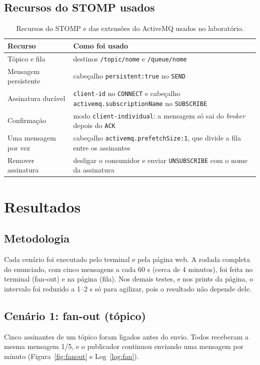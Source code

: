 \documentclass[11pt,a4paper]{article}
\begin{document}
\subsection{Recursos do STOMP usados}
\begin{table}[H]
\centering
\small
\begin{tabular}{@{}>{\raggedright\arraybackslash}p{5cm}>{\raggedright\arraybackslash}p{9.6cm}@{}}
\toprule
\textbf{Recurso} & \textbf{Como foi usado} \\
\midrule
T\'opico e fila         & destinos \texttt{/topic/nome} e \texttt{/queue/nome} \\
Mensagem persistente   & cabe\c{c}alho \texttt{persistent:true} no \texttt{SEND} \\
Assinatura dur\'avel    & \texttt{client-id} no \texttt{CONNECT} e cabe\c{c}alho \texttt{activemq.subscriptionName} no \texttt{SUBSCRIBE} \\
Confirma\c{c}\~ao        & modo \texttt{client-individual}: a mensagem s\'o sai do \textit{broker} depois do \texttt{ACK} \\
Uma mensagem por vez   & cabe\c{c}alho \texttt{activemq.prefetchSize:1}, que divide a fila entre os assinantes \\
Remover assinatura     & desligar o consumidor e enviar \texttt{UNSUBSCRIBE} com o nome da assinatura \\
\bottomrule
\end{tabular}
\caption{Recursos do STOMP e das extens\~oes do ActiveMQ usados no laborat\'orio.}
\end{table}

\section{Resultados}

\subsection{Metodologia}
Cada cen\'ario foi executado pelo terminal e pela p\'agina web. A rodada completa do
enunciado, com cinco mensagens a cada 60 s (cerca de 4 minutos), foi feita no terminal
(fan-out) e na p\'agina (fila). Nos demais testes, e nos prints da p\'agina, o intervalo foi
reduzido a 1--2 s s\'o para agilizar, pois o resultado n\~ao depende dele.

\subsection{Cen\'ario 1: fan-out (t\'opico)}
Cinco assinantes de um t\'opico foram ligados antes do envio. Todos receberam a
mesma mensagem 1/5, e o publicador continuou enviando uma mensagem por minuto
(Figura~\ref{fig:fanout} e Log~\ref{log:fan}).
\end{document}

